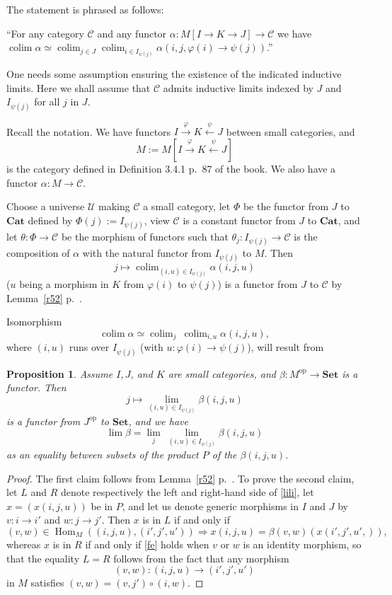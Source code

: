 \documentclass[12pt]{article}%
\newtheorem{prop}[thm]{Proposition}
\theoremstyle{remark}
\theoremstyle{definition}
\newcommand{\C}{\mathcal C}
\newcommand{\U}{\mathcal U}
\newcommand{\Cat}{\mathbf{Cat}}%
\newcommand{\Set}{\mathbf{Set}}%
\newcommand{\pp}{\varphi}
\newcommand{\then}{\Rightarrow}
\DeclareMathOperator*{\colim}{colim}%
\DeclareMathOperator{\Hom}{Hom}%
\DeclareMathOperator{\op}{op}
\begin{document}
The statement is phrased as follows: 

``For any category $\C$ and any functor $\alpha:M[I\to K\rightarrow J]\to\C$ we have $\colim\alpha\simeq\colim_{j\in J}\colim_{i\in I_{\psi(j)}}\alpha(i,j,\pp(i)\to\psi(j))$.'' 

One needs some assumption ensuring the existence of the indicated inductive limits. Here we shall assume that $\C$ admits inductive limits indexed by $J$ and $I_{\psi(j)}$ for all $j$ in $J$. 

Recall the notation. We have functors $I\xrightarrow\pp K\xleftarrow\psi J$ between small categories, and 
$$
M:=M[I\xrightarrow\pp K\xleftarrow\psi J] 
$$ 
is the category defined in Definition 3.4.1 p.~87 of the book. We also have a functor $\alpha:M\to\C$. 

Choose a universe $\U$ making $\C$ a small category, let $\Phi$ be the functor from $J$ to $\Cat$ defined by $\Phi(j):=I_{\psi(j)}$, view $\C$ is a constant functor from $J$ to $\Cat$, and let $\theta:\Phi\to\C$ be the morphism of functors such that $\theta_j:I_{\psi(j)}\to\C$ is the composition of $\alpha$ with the natural functor from $I_{\psi(j)}$ to $M$. Then 
$$
j\mapsto\colim_{(i,u)\in I_{\psi(j)}}\alpha(i,j,u) 
$$ 
($u$ being a morphism in $K$ from $\pp(i)$ to $\psi(j)$) is a functor from $J$ to $\C$ by Lemma~\ref{r52} p.~\pageref{r52}. 

Isomorphism 
%
\begin{equation}\label{coco2}
\colim\alpha\simeq\colim_j\ \colim_{i,u}\alpha(i,j,u),
\end{equation} 
%
where $(i,u)$ runs over $I_{\psi(j)}$ (with $u:\pp(i)\to\psi(j)$), will result from 

\begin{prop}
Assume $I,J$, and $K$ are small categories, and $\beta:M^{\op}\to\Set$ is a functor. Then 
$$
j\mapsto\lim_{(i,u)\in I_{\psi(j)}}\beta(i,j,u)
$$ 
is a functor from $J^{\op}$ to $\Set$, and we have
%
\begin{equation}\label{lili} 
\lim\beta=\lim_j\ \lim_{(i,u)\in I_{\psi(j)}}\beta(i,j,u) 
\end{equation} 
%
as an equality between subsets of the product $P$ of the $\beta(i,j,u)$. 
\end{prop} 

\begin{proof}
The first claim follows from Lemma~\ref{r52} p.~\pageref{r52}. To prove the second claim, let $L$ and $R$ denote respectively the left and right-hand side of \eqref{lili}, let $x=(x(i,j,u))$ be in $P$, and let us denote generic morphisms in $I$ and $J$ by $v:i\to i'$ and $w:j\to j'$. Then $x$ is in $L$ if and only if 
%
\begin{equation}\label{fe} 
(v,w)\in\Hom_M((i,j,u),(i',j',u'))\then x(i,j,u)=\beta(v,w)(x(i',j',u',)), 
\end{equation} 
%
whereas $x$ is in $R$ if and only if \eqref{fe} holds when $v$ or $w$ is an identity morphism, so that the equality $L=R$ follows from the fact that any morphism 
$$
(v,w):(i,j,u)\to(i',j',u')
$$ 
in $M$ satisfies $(v,w)=(v,j')\circ(i,w)$.
\end{proof}
\end{document}

